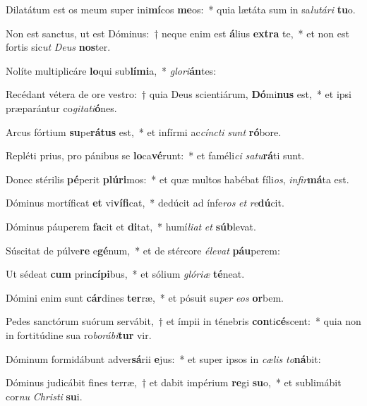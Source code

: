 \item Dilatátum est os meum super ini\textbf{mí}cos \textbf{me}os:~* quia lætáta sum in sa\textit{lu}\textit{tá}\textit{ri} \textbf{tu}o.
\item Non est sanctus, ut est Dóminus:~† neque enim est \textbf{á}lius \textbf{ex}\textbf{tra} te,~* et non est fortis sic\textit{ut} \textit{De}\textit{us} \textbf{nos}ter.
\item Nolíte multiplicáre \textbf{lo}qui sub\textbf{lí}\textbf{mi}a,~* \textit{glo}\textit{ri}\textbf{án}tes:
\item Recédant vétera de ore vestro:~† quia Deus scientiárum, \textbf{Dó}mi\textbf{nus} est,~* et ipsi præparántur co\textit{gi}\textit{ta}\textit{ti}\textbf{ó}nes.
\item Arcus fórtium \textbf{su}pe\textbf{rá}\textbf{tus} est,~* et infírmi ac\textit{cínc}\textit{ti} \textit{sunt} \textbf{ró}bore.
\item Repléti prius, pro pánibus se \textbf{lo}ca\textbf{vé}runt:~* et faméli\textit{ci} \textit{sa}\textit{tu}\textbf{rá}ti sunt.
\item Donec stérilis \textbf{pé}perit \textbf{plú}\textbf{ri}mos:~* et quæ multos habébat fíli\textit{os}, \textit{in}\textit{fir}\textbf{má}ta est.
\item Dóminus mortíficat \textbf{et} vi\textbf{ví}\textbf{fi}cat,~* dedúcit ad ínfe\textit{ros} \textit{et} \textit{re}\textbf{dú}cit.
\item Dóminus páuperem \textbf{fa}cit et \textbf{di}tat,~* humí\textit{li}\textit{at} \textit{et} \textbf{súb}levat.
\item Súscitat de púlve\textbf{re} e\textbf{gé}num,~* et de stércore \textit{é}\textit{le}\textit{vat} \textbf{páu}perem:
\item Ut sédeat \textbf{cum} prin\textbf{cí}\textbf{pi}bus,~* et sólium \textit{gló}\textit{ri}\textit{æ} \textbf{té}neat.
\item Dómini enim sunt \textbf{cár}dines \textbf{ter}ræ,~* et pósuit su\textit{per} \textit{e}\textit{os} \textbf{or}bem.
\item Pedes sanctórum suórum servábit,~† et ímpii in ténebris \textbf{con}ti\textbf{cé}scent:~* quia non in fortitúdine sua ro\textit{bo}\textit{rá}\textit{bi}\textbf{tur} vir.
\item Dóminum formidábunt adver\textbf{sá}rii \textbf{e}jus:~* et super ipsos in \textit{cæ}\textit{lis} \textit{to}\textbf{ná}bit:
\item Dóminus judicábit fines terræ,~† et dabit impérium \textbf{re}gi \textbf{su}o,~* et sublimábit cor\textit{nu} \textit{Chris}\textit{ti} \textbf{su}i.
